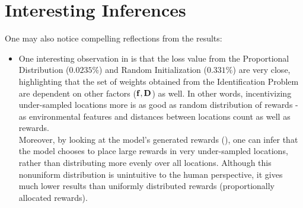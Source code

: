 \section{Interesting Inferences}
One may also notice compelling reflections from the results:
\begin{itemize}
    \item One interesting observation in  is that the loss value from the Proportional Distribution ($0.0235\%$) and Random Initialization ($0.331\%$) are very close, highlighting that the set of weights obtained from the Identification Problem are dependent on other factors ($\mathbf{f}, \mathbf{D}$) as well. In other words, incentivizing under-sampled locations more is as good as random distribution of rewards - as environmental features and distances between locations count as well as rewards.\\
    Moreover, by looking at the model's generated rewards (), one can infer that the model chooses to place large rewards in very under-sampled locations, rather than distributing more evenly over all locations. Although this nonuniform distribution is unintuitive to the human perspective, it gives much lower results than uniformly distributed rewards (proportionally allocated rewards).
\end{itemize}
